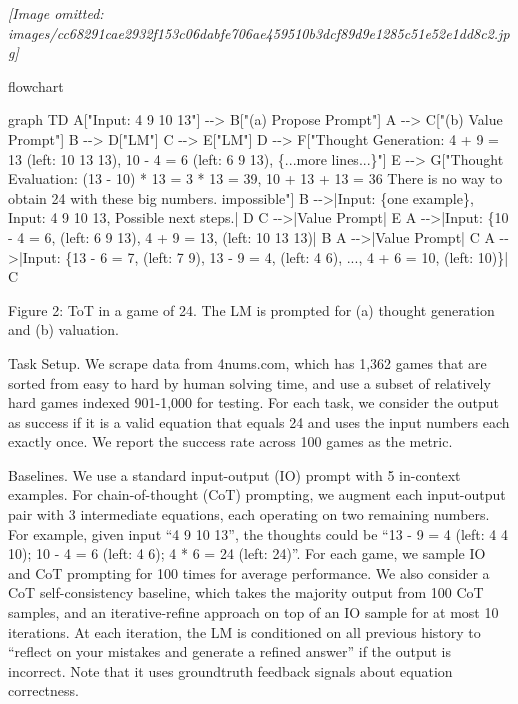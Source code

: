 \documentclass[
]{article}
\newenvironment{Shaded}{}{}
\newcommand{\NormalTok}[1]{#1}
\begin{document}
\textit{[Image omitted: images/cc68291cae2932f153c06dabfe706ae459510b3dcf89d9e1285c51e52e1dd8c2.jpg]}

flowchart

\begin{Shaded}
\begin{Highlighting}[]
\NormalTok{graph TD}
\NormalTok{    A["Input: 4 9 10 13"] {-}{-}\textgreater{} B["(a) Propose Prompt"]}
\NormalTok{    A {-}{-}\textgreater{} C["(b) Value Prompt"]}
\NormalTok{    B {-}{-}\textgreater{} D["LM"]}
\NormalTok{    C {-}{-}\textgreater{} E["LM"]}
\NormalTok{    D {-}{-}\textgreater{} F["Thought Generation: 4 + 9 = 13 (left: 10 13 13), 10 {-} 4 = 6 (left: 6 9 13), \{...more lines...\}"]}
\NormalTok{    E {-}{-}\textgreater{} G["Thought Evaluation: (13 {-} 10) * 13 = 3 * 13 = 39, 10 + 13 + 13 = 36 There is no way to obtain 24 with these big numbers. impossible"]}
\NormalTok{    B {-}{-}\textgreater{}|Input: \{one example\}, Input: 4 9 10 13, Possible next steps.| D}
\NormalTok{    C {-}{-}\textgreater{}|Value Prompt| E}
\NormalTok{    A {-}{-}\textgreater{}|Input: \{10 {-} 4 = 6, (left: 6 9 13), 4 + 9 = 13, (left: 10 13 13)| B}
\NormalTok{    A {-}{-}\textgreater{}|Value Prompt| C}
\NormalTok{    A {-}{-}\textgreater{}|Input: \{13 {-} 6 = 7, (left: 7 9), 13 {-} 9 = 4, (left: 4 6), ..., 4 + 6 = 10, (left: 10)\}| C}
\end{Highlighting}
\end{Shaded}

Figure 2: ToT in a game of 24. The LM is prompted for (a) thought
generation and (b) valuation.

Task Setup. We scrape data from 4nums.com, which has 1,362 games that
are sorted from easy to hard by human solving time, and use a subset of
relatively hard games indexed 901-1,000 for testing. For each task, we
consider the output as success if it is a valid equation that equals 24
and uses the input numbers each exactly once. We report the success rate
across 100 games as the metric.

Baselines. We use a standard input-output (IO) prompt with 5 in-context
examples. For chain-of-thought (CoT) prompting, we augment each
input-output pair with 3 intermediate equations, each operating on two
remaining numbers. For example, given input ``4 9 10 13'', the thoughts
could be ``13 - 9 = 4 (left: 4 4 10); 10 - 4 = 6 (left: 4 6); 4 * 6 = 24
(left: 24)''. For each game, we sample IO and CoT prompting for 100
times for average performance. We also consider a CoT self-consistency
baseline, which takes the majority output from 100 CoT samples, and an
iterative-refine approach on top of an IO sample for at most 10
iterations. At each iteration, the LM is conditioned on all previous
history to ``reflect on your mistakes and generate a refined answer'' if
the output is incorrect. Note that it uses groundtruth feedback signals
about equation correctness.
\end{document}
